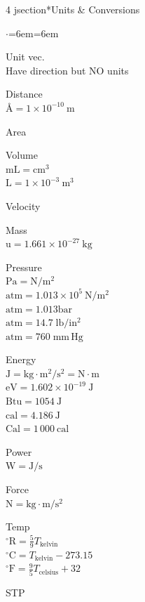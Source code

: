 \documentclass[letterpaper,landscape,10pt]{article}
\newenvironment{litemize}
{\begin{list}{$\cdot$}{\leftmargin=6em\labelwidth=6em}
	\setlength{\itemsep}{0pt}
	\setlength{\parskip}{0pt}
	\setlength{\parsep}{0pt}}
{\end{list}}
\begin{document}
{\begin{multicols}{4}
jsection*{Units \& Conversions}
	\begin{litemize}
		\item[Unit vec.] \ \\
			Have direction but NO units
	    \item[Distance] \ \\
		  \AA $= 1 \times 10^{-10} \: \mathrm{m} $
	    \item[Area] \ \\
	    \item[Volume] \ \\
		  $\mathrm{mL}=\mathrm{cm^3}$ \\
		  $\mathrm{L}=1\times10^{-3}\:\mathrm{m^3}$
		\item[Velocity] \ \\
		\item[Mass] \ \\
		  $\mathrm{u = 1.661 \times 10^{-27}\:kg}$
		\item[Pressure] \ \\
		  $\mathrm{Pa = N/m^2}$ \\
		  $\mathrm{atm} = 1.013 \times 10^{5}\:\mathrm{N/m^2}$ \\
		  $\mathrm{atm} = 1.013 \mathrm{bar}$ \\
		  $\mathrm{atm} = 14.7\;\mathrm{lb/in^2}$ \\
		  $\mathrm{atm} = 760\;\mathrm{mm\,Hg}$
		\item[Energy] \ \\
		  $\mathrm{J = kg \cdot m^2 / s^2 = N \cdot m}$ \\
		  $\mathrm{eV = 1.602 \times 10^{-19}\:J}$ \\
		  $\mathrm{Btu = 1054 \:J}$ \\
		  $\mathrm{cal = 4.186 \:J}$ \\
		  $\mathrm{Cal = 1\,000 \:cal}$
		\item[Power] \ \\
		  $\mathrm{W = J/s}$
		\item[Force] \ \\
		  $\mathrm{N = kg \cdot m/s^2}$
		\item[Temp] \ \\
		  $\mathrm{^\circ R} = \frac{5}{9}T_{\mathrm{kelvin}}$ \\
		  $\mathrm{^\circ C} = T_{\mathrm{kelvin}}-273.15$ \\
		  $\mathrm{^\circ F} = \frac{9}{5}T_{\mathrm{celsius}}+32$
		\item[STP] \ \\

\end{litemize}
\end{multicols}}
\end{document}
